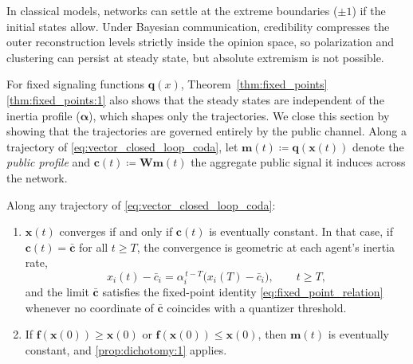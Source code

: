 \documentclass[journal,twoside,web]{ieeecolor}
\begin{document}
\begin{remark}
    \label{rem:impossibility_extremism}
    In classical models, networks can settle at the extreme boundaries ($\pm 1$) if the initial states allow. Under Bayesian communication, credibility compresses the outer reconstruction levels strictly inside the opinion space, so polarization and clustering can persist at steady state, but absolute extremism is not possible.
\end{remark}

For fixed signaling functions $\bm{q}(x)$, Theorem~\ref{thm:fixed_points}\ref{thm:fixed_points:1} also shows that the steady states are independent of the inertia profile ($\bm \alpha$), which shapes only the trajectories. We close this section by showing that the trajectories are governed entirely by the public channel. Along a trajectory of \eqref{eq:vector_closed_loop_coda}, let $\bm m(t)\coloneqq \bm q(\bm x(t))$ denote the \emph{public profile} and $\bm c(t)\coloneqq \bm W\bm m(t)$ the aggregate public signal it induces across the network.

\begin{proposition}
    \label{prop:dichotomy}
    Along any trajectory of \eqref{eq:vector_closed_loop_coda}:
    \begin{enumerate}[wide, label=\roman*), ref=(\roman*)]
        \item $\bm x(t)$ converges if and only if $\bm c(t)$ is eventually constant. In that case, if $\bm c(t)=\bar{\bm c}$ for all $t\ge T$, the convergence is geometric at each agent's inertia rate,\label{prop:dichotomy:1}
              \begin{equation}
                  \label{eq:conv-switch}
                  x_i(t)-\bar c_i=\alpha_i^{\,t-T}\bigl(x_i(T)-\bar c_i\bigr),
                  \qquad t\ge T,
              \end{equation}
              and the limit $\bar{\bm c}$ satisfies the fixed-point identity \eqref{eq:fixed_point_relation} whenever no coordinate of $\bar{\bm c}$ coincides with a quantizer threshold.
        \item If $\bm f(\bm x(0))\ge\bm x(0)$ or $\bm f(\bm x(0))\le\bm x(0)$, then $\bm m(t)$ is eventually constant, and \ref{prop:dichotomy:1} applies.\label{prop:dichotomy:2}
    \end{enumerate}
\end{proposition}
\end{document}
